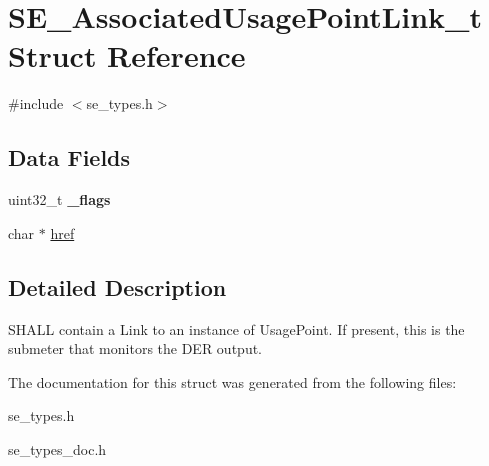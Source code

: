 \hypertarget{structSE__AssociatedUsagePointLink__t}{}\section{S\+E\+\_\+\+Associated\+Usage\+Point\+Link\+\_\+t Struct Reference}
\label{structSE__AssociatedUsagePointLink__t}


{\ttfamily \#include $<$se\+\_\+types.\+h$>$}

\subsection*{Data Fields}
\begin{DoxyCompactItemize}
\item 
uint32\+\_\+t {\bfseries \+\_\+flags}
\item 
char $\ast$ \hyperlink{group__AssociatedUsagePointLink_gafee3c39a277193f4fbf70e6c77414389}{href}
\end{DoxyCompactItemize}


\subsection{Detailed Description}
S\+H\+A\+LL contain a Link to an instance of Usage\+Point. If present, this is the submeter that monitors the D\+ER output. 

The documentation for this struct was generated from the following files\+:\begin{DoxyCompactItemize}
\item 
se\+\_\+types.\+h\item 
se\+\_\+types\+\_\+doc.\+h\end{DoxyCompactItemize}
